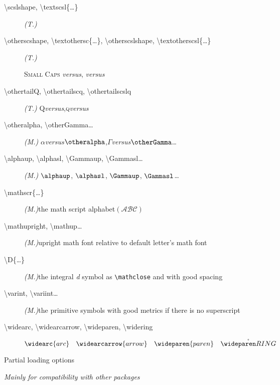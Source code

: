 \documentclass[a4paper,11pt]{christophe}
\newcommand{\versus}{\;\textit{versus}\;}
\begin{document}
\begin{description}
  \item[\textbackslash scslshape, \textbackslash textscsl\{\dots\}]\textit{(T.)}\quad {}
  \item[\textbackslash otherscshape, \textbackslash textothersc\{\dots\}, \textbackslash otherscslshape, \textbackslash textotherscsl\{\dots\}]\textit{(T.)}\quad 
  
       \textsc{Small Caps} \versus{}, \qquad
        \versus{}
  \item[\textbackslash othertailQ, \textbackslash othertailscq, \textbackslash othertailscslq]\textit{(T.)}\quad
       Q\versus\othertailQ\quad,\quad \textsc{q}\versus\othertailscq
  \item[\textbackslash otheralpha, \textbackslash otherGamma\dots]\textit{(M.)}\quad
       $\alpha$\versus$\otheralpha$,\quad$\Gamma$\versus$\otherGamma$\dots
  \item[\textbackslash alphaup, \textbackslash alphasl, 
       \textbackslash Gammaup, \textbackslash Gammasl\dots]\textit{(M.)}\quad
       $\alphaup$, $\alphasl$, $\Gammaup$, $\Gammasl$\dots
  \item[\textbackslash mathscr\{\dots\}]\textit{(M.)}\quad the math script alphabet\quad $(\mathscr{ABC})$
  \item[\textbackslash mathupright, \textbackslash mathup\dots]\textit{(M.)}\quad upright math font relative to default letter's math font
  \item[\textbackslash D\{\dots\}]\textit{(M.)}\quad the integral \textit{d} symbol as \verb=\mathclose= 
       and with good spacing
  \item[\textbackslash varint, \textbackslash variint\dots]\textit{(M.)}\quad the primitive symbols with good metrics 
       if there is no superscript
  \item[\textbackslash widearc, \textbackslash widearcarrow, \textbackslash wideparen,
       \textbackslash widering]\quad $\widearc{arc}\quad\widearcarrow{arrow}\quad\wideparen{paren}\quad\widering{RING}$
\end{description}

\vfill

\begin{center}
\textsf{\Large Partial loading options}
\end{center}

\begin{center}
\textit{\small Mainly for compatibility with other packages}
\end{center}
\end{document}
